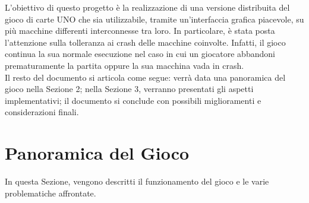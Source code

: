 \documentclass[11pt]{article} %
\begin{document}
L'obiettivo di questo progetto è la realizzazione di una versione distribuita del gioco di carte UNO che sia utilizzabile, tramite un'interfaccia grafica 
piacevole, su più macchine differenti interconnesse tra loro. In particolare, è stata posta l'attenzione sulla tolleranza ai crash delle macchine coinvolte.
Infatti, il gioco continua la sua normale esecuzione nel caso in cui un giocatore abbandoni prematuramente la partita oppure la sua macchina vada in crash.\\
Il resto del documento si articola come segue: verrà data una panoramica del gioco nella Sezione 2; nella Sezione 3, verranno presentati gli aspetti implementativi;
il documento si conclude con possibili miglioramenti e considerazioni finali.

\section{Panoramica del Gioco}
In questa Sezione, vengono descritti il funzionamento del gioco e le varie problematiche affrontate.
\end{document}
